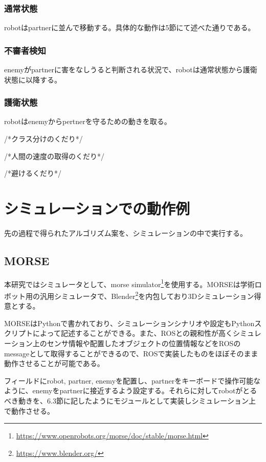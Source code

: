 \documentclass{kuisthesis}
\begin{document}
\subsubsection*{通常状態}
robotはpartnerに並んで移動する。具体的な動作は5節にて述べた通りである。
\subsubsection*{不審者検知}
enemyがpartnerに害をなしうると判断される状況で、robotは通常状態から護衛状態に以降する。
\subsubsection*{護衛状態}
robotはenemyからpertnerを守るための動きを取る。


/*クラス分けのくだり*/

/*人間の速度の取得のくだり*/

/*避けるくだり*/






\section{シミュレーションでの動作例}

先の過程で得られたアルゴリズム案を、シミュレーションの中で実行する。

\subsection{MORSE}

本研究ではシミュレータとして、morse simulator\footnote{\url{https://www.openrobots.org/morse/doc/stable/morse.html}}を使用する。MORSEは学術ロボット用の汎用シミュレータで、Blender\footnote{\url{https://www.blender.org/}}を内包しており3Dシミュレーション得意とする。

MORSEはPythonで書かれており、シミュレーションシナリオや設定もPythonスクリプトによって記述することができる。また、ROSとの親和性が高くシミュレーション上のセンサ情報や配置したオブジェクトの位置情報などをROSのmessageとして取得することができるので、ROSで実装したものをほぼそのまま動作させることが可能である。

フィールドにrobot, partner, enemyを配置し、partnerをキーボードで操作可能なように、enemyをpartnerに接近するよう設定する。それらに対してrobotがとるべき動きを、6.3節に記したようにモジュールとして実装しシミュレーション上で動作させる。
\end{document}
